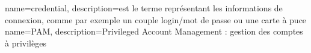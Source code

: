{
	name=credential,
	description={est le terme représentant les informations de connexion, comme par exemple un couple login/mot de passe ou une carte à puce}
}
{
	name=PAM,
	description={Privileged Account Management : gestion des comptes à privilèges}
}